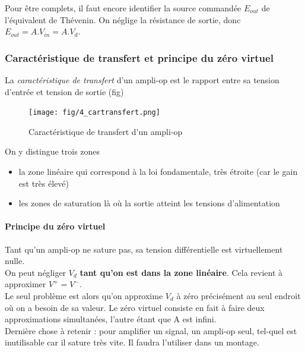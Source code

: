 \documentclass[a4paper]{article}
\begin{document}
    Pour être complets, il faut encore identifier la source commandée $E_{out}$
    de l'équivalent de Thévenin. On néglige la résistance de sortie, donc 
    $E_{out} = A.V_{in} = A.V_d$.

    \subsubsection{Caractéristique de transfert et principe du zéro virtuel}
    La \textit{caractéristique de transfert} d'un ampli-op est le rapport entre
    sa tension d'entrée et tension de sortie (fig) 

    \begin{figure}[H]
        \begin{center}
            \texttt{[image: fig/4\_cartransfert.png]}
            \caption{Caractéristique de transfert d'un ampli-op}
            \label{fig:4_cartransfert}
        \end{center}
    \end{figure}

    On y distingue trois zones
    \begin{itemize}
        \item la zone linéaire qui correspond à la loi fondamentale, très étroite
        (car le gain est très élevé)
        \item les zones de saturation là où la sortie atteint les tensions d'alimentation
    \end{itemize}

    \paragraph{Principe du zéro virtuel} Tant qu'un ampli-op ne sature pas, sa 
    tension différentielle est virtuellement nulle.\\

    On peut négliger $V_d$ \textbf{tant qu'on est dans la zone linéaire}. Cela
    revient à approximer $V^+ = V^-$.\\

    Le seul problème est alors qu'on approxime $V_d$ à zéro précisément au seul
    endroit où on a besoin de sa valeur. Le zéro virtuel consiste en fait à faire
    deux approximations simultanées, l'autre étant que A est infini.\\

    Dernière chose à retenir : pour amplifier un signal, un ampli-op seul, tel-quel
    est inutilisable car il sature très vite. Il faudra l'utiliser dans un montage.
\end{document}

